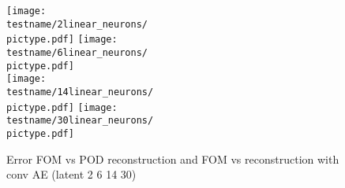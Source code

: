 \documentclass[USenglish]{article}
\newcommand{\1}{\begin{pmatrix}
		1\\
		1
\end{pmatrix}}
\begin{document}
\begin{figure}
	\newcommand{\pictype}{Error_POD-inv_transform}
	\texttt{[image: \\testname/2linear\_neurons/\\pictype.pdf]}
	\texttt{[image: \\testname/6linear\_neurons/\\pictype.pdf]}\\
	\texttt{[image: \\testname/14linear\_neurons/\\pictype.pdf]}
	\texttt{[image: \\testname/30linear\_neurons/\\pictype.pdf]}
	\caption{Error FOM vs POD reconstruction and FOM vs reconstruction with conv AE (latent 2 6 14 30)}
\end{figure}

	
\end{document}
